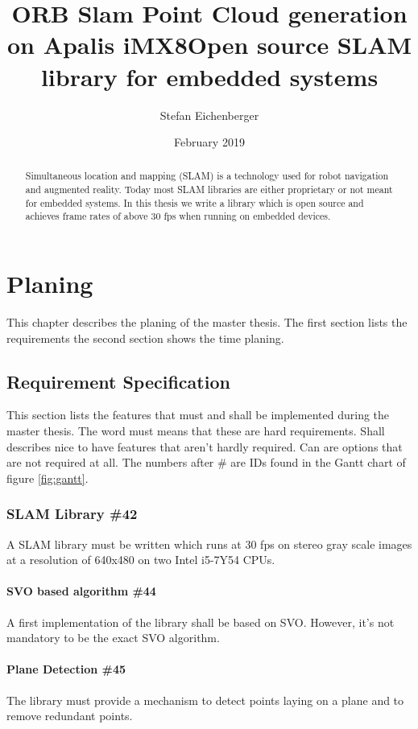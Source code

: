 \documentclass[11pt,a4paper,titlepage,oneside]{report}
\title{ORB Slam Point Cloud generation on Apalis iMX8}
\author{Stefan Eichenberger}
\date{February 2019}
\begin{document}
\title{Open source SLAM library for embedded systems}

\maketitle
\begin{abstract}
  Simultaneous location and mapping (SLAM) is a technology used for robot navigation and augmented reality. Today most SLAM libraries are either proprietary or not meant for embedded systems. In this thesis we write a library which is open source and achieves frame rates of above 30 fps when running on embedded devices.
\end{abstract}

\tableofcontents

\chapter{Planing}

This chapter describes the planing of the master thesis. The first section lists the requirements the second section shows the time planing.

\section{Requirement Specification}

This section lists the features that must and shall be implemented during the master thesis. The word must means that these are hard requirements. Shall describes nice to have features that aren't hardly required. Can are options that are not required at all. The numbers after \# are IDs found in the Gantt chart of figure \ref{fig:gantt}.

\subsection{SLAM Library \#42}
A SLAM library must be written which runs at 30 fps on stereo gray scale images at a resolution of 640x480 on two Intel i5-7Y54 CPUs.
\subsubsection{SVO based algorithm \#44}
A first implementation of the library shall be based on SVO. However, it's not mandatory to be the exact SVO algorithm.
\subsubsection{Plane Detection \#45}
The library must provide a mechanism to detect points laying on a plane and to remove redundant points.
\end{document}
